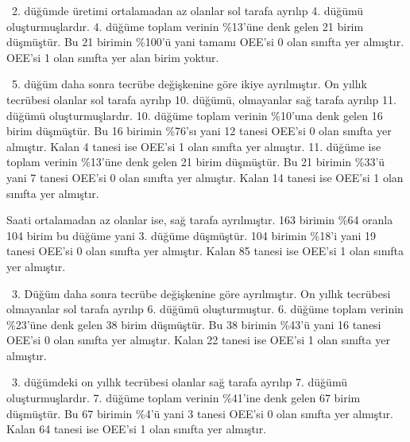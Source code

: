\documentclass[12pt,twoside]{deuthesis}
\begin{document}
~2. düğümde üretimi ortalamadan az olanlar sol tarafa ayrılıp 4. düğümü oluşturmuşlardır. 4. düğüme toplam verinin \%13'üne denk gelen 21 birim düşmüştür. Bu 21 birimin \%100'ü yani tamamı OEE'si 0 olan sınıfta yer almıştır. OEE'si 1 olan sınıfta yer alan birim yoktur.

~5. düğüm daha sonra tecrübe değişkenine göre ikiye ayrılmıştır. On yıllık tecrübesi olanlar sol tarafa ayrılıp 10. düğümü, olmayanlar sağ tarafa ayrılıp 11. düğümü oluşturmuşlardır. 10. düğüme toplam verinin \%10'una denk gelen 16 birim düşmüştür. Bu 16 birimin \%76'sı yani 12 tanesi OEE'si 0 olan sınıfta yer almıştır. Kalan 4 tanesi ise OEE'si 1 olan sınıfta yer almıştır.
11. düğüme ise toplam verinin \%13'üne denk gelen 21 birim düşmüştür. Bu 21 birimin \%33'ü yani 7 tanesi OEE'si 0 olan sınıfta yer almıştır. Kalan 14 tanesi ise OEE'si 1 olan sınıfta yer almıştır.

Saati ortalamadan az olanlar ise, sağ tarafa ayrılmıştır. 163 birimin \%64 oranla 104 birim bu düğüme yani 3. düğüme düşmüştür. 104 birimin \%18'i yani 19 tanesi OEE'si 0 olan sınıfta yer almıştır. Kalan 85 tanesi ise OEE'si 1 olan sınıfta yer almıştır.

~3. Düğüm daha sonra tecrübe değişkenine göre ayrılmıştır. On yıllık tecrübesi olmayanlar sol tarafa ayrılıp 6. düğümü oluşturmuştur. 6. düğüme toplam verinin \%23'üne denk gelen 38 birim düşmüştür. Bu 38 birimin \%43'ü yani 16 tanesi OEE'si 0 olan sınıfta yer almıştır. Kalan 22 tanesi ise OEE'si 1 olan sınıfta yer almıştır.

~3. düğümdeki on yıllık tecrübesi olanlar sağ tarafa ayrılıp 7. düğümü oluşturmuşlardır. 7. düğüme toplam verinin \%41'ine denk gelen 67 birim düşmüştür. Bu 67 birimin \%4'ü yani 3 tanesi OEE'si 0 olan sınıfta yer almıştır. Kalan 64 tanesi ise OEE'si 1 olan sınıfta yer almıştır.
\end{document}
